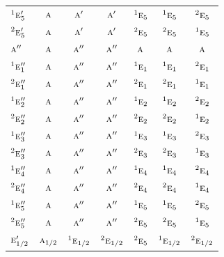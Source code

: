 \documentclass[10pt,a4paper]{article}
\numberwithin{equation}{section}
\newcommand{\irr}[1]{\text{\normalfont\scshape #1}}
\newcommand{\conjpair}[1]{{}^{#1}}
\begin{document}
{\begin{longtable}{@{}lcccccc@{}}
$\conjpair{1}\irr{e}_{5}'$ & $\irr{a}$ & $\irr{a}'$ & $\irr{a}'$ & $\conjpair{1}\irr{e}_{5}$ & $\conjpair{1}\irr{e}_{5}$ & $\conjpair{2}\irr{e}_{5}$\\
$\conjpair{2}\irr{e}_{5}'$ & $\irr{a}$ & $\irr{a}'$ & $\irr{a}'$ & $\conjpair{2}\irr{e}_{5}$ & $\conjpair{2}\irr{e}_{5}$ & $\conjpair{1}\irr{e}_{5}$\\
$\irr{a}''$ & $\irr{a}$ & $\irr{a}''$ & $\irr{a}''$ & $\irr{a}$ & $\irr{a}$ & $\irr{a}$\\
$\conjpair{1}\irr{e}_{1}''$ & $\irr{a}$ & $\irr{a}''$ & $\irr{a}''$ & $\conjpair{1}\irr{e}_{1}$ & $\conjpair{1}\irr{e}_{1}$ & $\conjpair{2}\irr{e}_{1}$\\
$\conjpair{2}\irr{e}_{1}''$ & $\irr{a}$ & $\irr{a}''$ & $\irr{a}''$ & $\conjpair{2}\irr{e}_{1}$ & $\conjpair{2}\irr{e}_{1}$ & $\conjpair{1}\irr{e}_{1}$\\
$\conjpair{1}\irr{e}_{2}''$ & $\irr{a}$ & $\irr{a}''$ & $\irr{a}''$ & $\conjpair{1}\irr{e}_{2}$ & $\conjpair{1}\irr{e}_{2}$ & $\conjpair{2}\irr{e}_{2}$\\
$\conjpair{2}\irr{e}_{2}''$ & $\irr{a}$ & $\irr{a}''$ & $\irr{a}''$ & $\conjpair{2}\irr{e}_{2}$ & $\conjpair{2}\irr{e}_{2}$ & $\conjpair{1}\irr{e}_{2}$\\
$\conjpair{1}\irr{e}_{3}''$ & $\irr{a}$ & $\irr{a}''$ & $\irr{a}''$ & $\conjpair{1}\irr{e}_{3}$ & $\conjpair{1}\irr{e}_{3}$ & $\conjpair{2}\irr{e}_{3}$\\
$\conjpair{2}\irr{e}_{3}''$ & $\irr{a}$ & $\irr{a}''$ & $\irr{a}''$ & $\conjpair{2}\irr{e}_{3}$ & $\conjpair{2}\irr{e}_{3}$ & $\conjpair{1}\irr{e}_{3}$\\
$\conjpair{1}\irr{e}_{4}''$ & $\irr{a}$ & $\irr{a}''$ & $\irr{a}''$ & $\conjpair{1}\irr{e}_{4}$ & $\conjpair{1}\irr{e}_{4}$ & $\conjpair{2}\irr{e}_{4}$\\
$\conjpair{2}\irr{e}_{4}''$ & $\irr{a}$ & $\irr{a}''$ & $\irr{a}''$ & $\conjpair{2}\irr{e}_{4}$ & $\conjpair{2}\irr{e}_{4}$ & $\conjpair{1}\irr{e}_{4}$\\
$\conjpair{1}\irr{e}_{5}''$ & $\irr{a}$ & $\irr{a}''$ & $\irr{a}''$ & $\conjpair{1}\irr{e}_{5}$ & $\conjpair{1}\irr{e}_{5}$ & $\conjpair{2}\irr{e}_{5}$\\
$\conjpair{2}\irr{e}_{5}''$ & $\irr{a}$ & $\irr{a}''$ & $\irr{a}''$ & $\conjpair{2}\irr{e}_{5}$ & $\conjpair{2}\irr{e}_{5}$ & $\conjpair{1}\irr{e}_{5}$\\
$\irr{e}_{1/2}'$ & $\irr{a}_{1/2}$ & $\conjpair{1}\irr{e}_{1/2}$ & $\conjpair{2}\irr{e}_{1/2}$ & $\conjpair{2}\irr{e}_{5}$ & $\conjpair{1}\irr{e}_{1/2}$ & $\conjpair{2}\irr{e}_{1/2}$\\

\end{longtable}}
\end{document}
